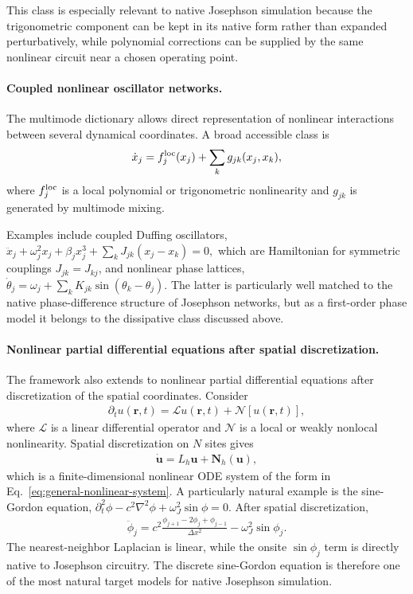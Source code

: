 \documentclass[pra,twocolumn,superscriptaddress,nofootinbib,floatfix]{revtex4-2}
\theoremstyle{remark}
\newcommand{\revcolor}{\color{blue}}
\DeclareRobustCommand{\rev}[1]{{\revcolor #1}}
\begin{document}
\rev{This class is especially relevant to native Josephson simulation because the trigonometric component can be kept in its native form rather than expanded perturbatively, while polynomial corrections can be supplied by the same nonlinear circuit near a chosen operating point.}

\paragraph{Coupled nonlinear oscillator networks.}
The multimode dictionary allows direct representation of nonlinear interactions between several dynamical coordinates. A broad accessible class is
\begin{align}
\dot x_j=f_j^{\rm loc}(x_j)+\sum_{k}g_{jk}(x_j,x_k),
\label{eq:coupled-network}
\end{align}
where \(f_j^{\rm loc}\) is a local polynomial or trigonometric nonlinearity and \(g_{jk}\) is generated by multimode mixing.

\rev{Examples include coupled Duffing oscillators, \(\ddot x_j+\omega_j^2x_j+\beta_jx_j^3+\sum_kJ_{jk}(x_j-x_k)=0,\) which are Hamiltonian for symmetric couplings \(J_{jk}=J_{kj}\), and nonlinear phase lattices, \(\dot\theta_j=\omega_j+\sum_kK_{jk}\sin(\theta_k-\theta_j).\)} \rev{The latter is particularly well matched to the native phase-difference structure of Josephson networks, but as a first-order phase model it belongs to the dissipative class discussed above.}

\paragraph{Nonlinear partial differential equations after spatial discretization.}
The framework also extends to nonlinear partial differential equations after discretization of the spatial coordinates. Consider
\begin{align}
\partial_t u(\mathbf r,t)=\mathcal L u(\mathbf r,t)+\mathcal N[u(\mathbf r,t)],
\label{eq:general-pde}
\end{align}
where \(\mathcal L\) is a linear differential operator and \(\mathcal N\) is a local or weakly nonlocal nonlinearity. Spatial discretization on \(N\) sites gives
\begin{align}
\dot{\mathbf u}=L_h\mathbf u+\mathbf N_h(\mathbf u),
\label{eq:semidiscrete-pde}
\end{align}
which is a finite-dimensional nonlinear ODE system of the form in Eq.~\eqref{eq:general-nonlinear-system}. \rev{A particularly natural example is the sine-Gordon equation, \(\partial_t^2\phi-c^2\nabla^2\phi+\omega_J^2\sin\phi=0.\)} After spatial discretization,
\begin{align}
\ddot\phi_j=c^2\frac{\phi_{j+1}-2\phi_j+\phi_{j-1}}{\Delta x^2}-\omega_J^2\sin\phi_j.
\label{eq:discrete-sine-gordon}
\end{align}
The nearest-neighbor Laplacian is linear, while the onsite \(\sin\phi_j\) term is directly native to Josephson circuitry. \rev{The discrete sine-Gordon equation is therefore one of the most natural target models for native Josephson simulation.}
\end{document}
